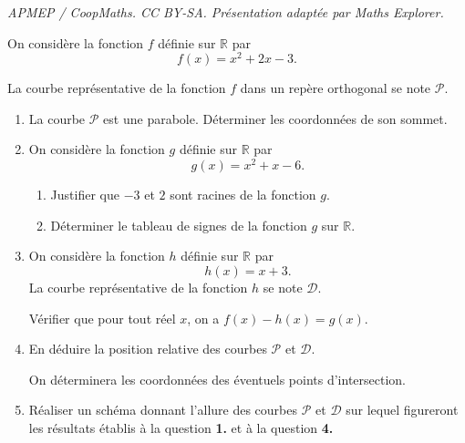 \documentclass[10pt]{article}
\providecommand{\R}{\mathbb{R}}
\begin{document}
\noindent\textit{APMEP / CoopMaths. CC BY-SA. Présentation adaptée par Maths Explorer.}\par\medskip
On considère la fonction $f$ définie sur $\R$ par
\[ f(x) = x^2+2x-3. \]

La courbe représentative de la fonction $f$ dans un repère orthogonal se note $\mathcal{P}$.

\begin{enumerate}
	\item La courbe $\mathcal{P}$ est une parabole. Déterminer les coordonnées de son sommet.

	\item On considère la fonction $g$ définie sur $\R$ par
	\[ g(x) = x^2+x-6. \]
	\begin{enumerate}
		\item Justifier que $-3$ et $2$ sont racines de la fonction $g$.
		\item Déterminer le tableau de signes de la fonction $g$ sur $\R$.
	\end{enumerate}

	\item On considère la fonction $h$ définie sur $\R$ par
	\[ h(x) = x+3. \]
	La courbe représentative de la fonction $h$ se note $\mathcal{D}$.

	Vérifier que pour tout réel $x$, on a $f(x) - h(x) = g(x)$.

	\item En déduire la position relative des courbes $\mathcal{P}$ et $\mathcal{D}$.

	On déterminera les coordonnées des éventuels points d'intersection.

	\item Réaliser un schéma donnant l'allure des courbes $\mathcal{P}$ et $\mathcal{D}$ sur lequel figureront les résultats établis à la question \textbf{1.} et à la question \textbf{4.}
\end{enumerate}
\end{document}
